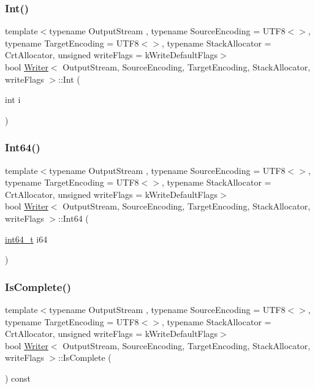\subsubsection{\texorpdfstring{Int()}{Int()}}
{\footnotesize\ttfamily template$<$typename Output\+Stream , typename Source\+Encoding  = U\+T\+F8$<$$>$, typename Target\+Encoding  = U\+T\+F8$<$$>$, typename Stack\+Allocator  = Crt\+Allocator, unsigned write\+Flags = k\+Write\+Default\+Flags$>$ \\
bool \hyperlink{classWriter}{Writer}$<$ Output\+Stream, Source\+Encoding, Target\+Encoding, Stack\+Allocator, write\+Flags $>$\+::Int (\begin{DoxyParamCaption}\item[{int}]{i }\end{DoxyParamCaption})\hspace{0.3cm}{\ttfamily [inline]}}

\mbox{\label{classWriter_a4144d7086ed9d3d807c373de242bde45}} 
\subsubsection{\texorpdfstring{Int64()}{Int64()}}
{\footnotesize\ttfamily template$<$typename Output\+Stream , typename Source\+Encoding  = U\+T\+F8$<$$>$, typename Target\+Encoding  = U\+T\+F8$<$$>$, typename Stack\+Allocator  = Crt\+Allocator, unsigned write\+Flags = k\+Write\+Default\+Flags$>$ \\
bool \hyperlink{classWriter}{Writer}$<$ Output\+Stream, Source\+Encoding, Target\+Encoding, Stack\+Allocator, write\+Flags $>$\+::Int64 (\begin{DoxyParamCaption}\item[{\hyperlink{stdint_8h_a414156feea104f8f75b4ed9e3121b2f6}{int64\+\_\+t}}]{i64 }\end{DoxyParamCaption})\hspace{0.3cm}{\ttfamily [inline]}}

\mbox{\label{classWriter_a07d74d36dd3191b06e0aab678c246157}} 
\subsubsection{\texorpdfstring{Is\+Complete()}{IsComplete()}}
{\footnotesize\ttfamily template$<$typename Output\+Stream , typename Source\+Encoding  = U\+T\+F8$<$$>$, typename Target\+Encoding  = U\+T\+F8$<$$>$, typename Stack\+Allocator  = Crt\+Allocator, unsigned write\+Flags = k\+Write\+Default\+Flags$>$ \\
bool \hyperlink{classWriter}{Writer}$<$ Output\+Stream, Source\+Encoding, Target\+Encoding, Stack\+Allocator, write\+Flags $>$\+::Is\+Complete (\begin{DoxyParamCaption}{ }\end{DoxyParamCaption}) const\hspace{0.3cm}{\ttfamily [inline]}}



